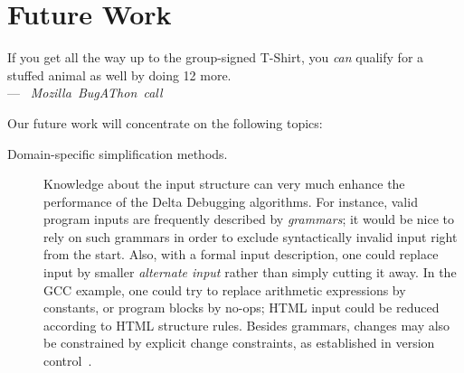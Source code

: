 \documentclass{acm_proc_article-sp}
\newcommand{\GCC}        {{\small GCC}\xspace}
\newcommand{\HTML}       {{\small HTML}\xspace}
\newcommand{\ddmin}{\textit{ddmin}\xspace}
\newenvironment{Quote}{%
\smallskip
\begin{minipage}[t]{\columnwidth}
\begin{flushright}%
\itshape%
\samepage%
}{\end{flushright}\end{minipage}\par}
\newcommand{\By}[2]{\\[1mm]---~\mbox{\textnormal{#1}} \mbox{\textsl{#2}}}
\theoremstyle{plain}
\begin{document}

\section{Future Work}
\label{sec:future-work}

\begin{Quote}
If you get all the way up to the group-signed T-Shirt, you \emph{can}
qualify for a stuffed animal as well by doing 12 more.  
\By{}{Mozilla BugAThon call}
\end{Quote}

\noindent
Our future work will concentrate on the following topics:
\begin{description}
\item[Domain-specific simplification methods.]  Knowledge about the
  input structure can very much enhance the performance of the Delta
  Debugging algorithms.  For instance, valid program inputs are
  frequently described by \emph{grammars}; it would be nice to rely on
  such grammars in order to exclude syntactically invalid input right
  from the start.  Also, with a formal input description, one could
  replace input by smaller \emph{alternate input} rather than simply
  cutting it away.  In the \GCC example, one could try to replace
  arithmetic expressions by constants, or program blocks by no-ops;
  \HTML input could be reduced according to \HTML structure rules.
  Besides grammars, changes may also be constrained by explicit change
  constraints, as established in version
  control~\cite{zeller/snelting/97/tosem}.
  

\end{description}
\end{document}
